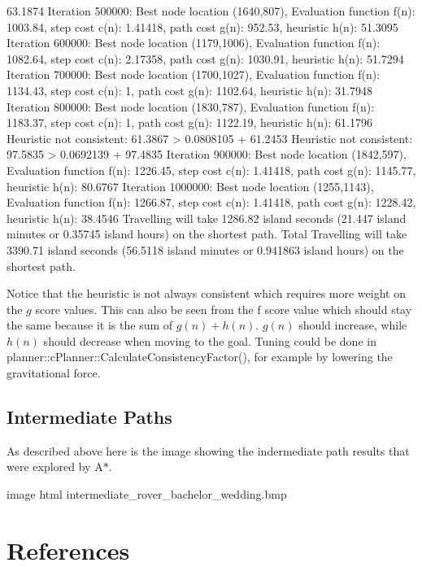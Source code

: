 \begin{DoxyCode}
       63.1874
Iteration 500000: Best node location (1640,807), 
     Evaluation function f(n): 1003.84, step cost c(n): 1.41418, path cost g(n): 952.53, heuristic h(n):
       51.3095
Iteration 600000: Best node location (1179,1006), 
     Evaluation function f(n): 1082.64, step cost c(n): 2.17358, path cost g(n): 1030.91, heuristic h(n):
       51.7294
Iteration 700000: Best node location (1700,1027), 
     Evaluation function f(n): 1134.43, step cost c(n): 1, path cost g(n): 1102.64, heuristic h(n): 31.7948
Iteration 800000: Best node location (1830,787), 
     Evaluation function f(n): 1183.37, step cost c(n): 1, path cost g(n): 1122.19, heuristic h(n): 61.1796
Heuristic not consistent: 61.3867 > 0.0808105 + 61.2453
Heuristic not consistent: 97.5835 > 0.0692139 + 97.4835
Iteration 900000: Best node location (1842,597), 
     Evaluation function f(n): 1226.45, step cost c(n): 1.41418, path cost g(n): 1145.77, heuristic h(n):
       80.6767
Iteration 1000000: Best node location (1255,1143), 
     Evaluation function f(n): 1266.87, step cost c(n): 1.41418, path cost g(n): 1228.42, heuristic h(n):
       38.4546
Travelling will take 1286.82 island seconds (21.447 island minutes or 0.35745 island hours) on the shortest
       path. 
Total Travelling will take 3390.71 island seconds (56.5118 island minutes or 0.941863 island hours) on the
       shortest path. 
\end{DoxyCode}


Notice that the heuristic is not always consistent which requires more weight on the $g$ score values. This can also be seen from the f score value which should stay the same because it is the sum of $ g(n) + h(n) $. $g(n)$ should increase, while $h(n)$ should decrease when moving to the goal. Tuning could be done in planner\+::c\+Planner\+::\+Calculate\+Consistency\+Factor(), for example by lowering the gravitational force.

\subsection*{Intermediate Paths}

As described above here is the image showing the indermediate path results that were explored by A$\ast$.

image html intermediate\+\_\+rover\+\_\+bachelor\+\_\+wedding.\+bmp



\section*{References}

